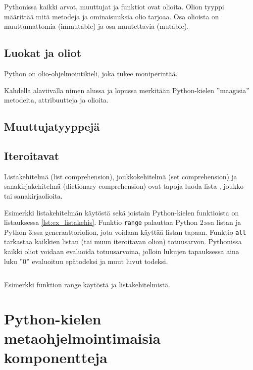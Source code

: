 \documentclass[finnish]{tktltiki2}
\theoremstyle{definition}
\theoremstyle{remark}
\begin{document}
Pythonissa kaikki arvot, muuttujat ja funktiot ovat olioita. Olion tyyppi määrittää mitä metodeja ja ominaisuuksia olio tarjoaa. Osa olioista on muuttumattomia (immutable) ja osa muutettavia (mutable).

\subsection{Luokat ja oliot}


Python on olio-ohjelmointikieli, joka tukee moniperintää.

Kahdella alaviivalla nimen alussa ja lopussa merkitään Python-kielen ''maagisia'' metodeita, attribuutteja ja olioita.


\subsection{Muuttujatyyppejä}

\subsection{Iteroitavat}

Listakehitelmä (list comprehension), joukkokehitelmä (set comprehension) ja sanakirjakehitelmä (dictionary comprehension) ovat tapoja luoda lista-, joukko- tai sanakirjaolioita. 

Esimerkki listakehitelmän käytöstä sekä joistain Python-kielen funktioista on listauksessa \ref{lst:ex_listakehis}. Funktio \verb|range| palauttaa Python 2:ssa listan ja Python 3:ssa generaattoriolion, jota voidaan käyttää listan tapaan. Funktio \verb|all| tarkastaa kaikkien listan (tai muun iteroitavan olion) totuusarvon. Pythonissa kaikki oliot voidaan evaluoida totuusarvoina, jolloin lukujen tapauksessa aina luku ''0'' evaluoituu epätodeksi ja muut luvut todeksi.


\begin{listing}
    \inputminted{python}{code/luvut.py}
    \label{lst:ex_listakehis}
    \caption{Esimerkki funktion range käytöstä ja listakehitelmistä.}
\end{listing}



\section{Python-kielen metaohjelmointimaisia komponentteja}
\end{document}

